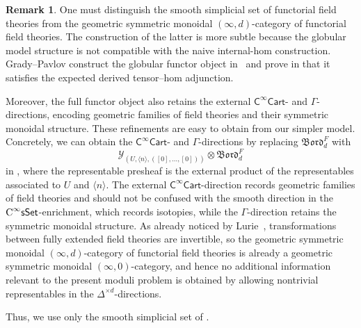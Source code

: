 \documentclass{amsart}
\newcommand{\cat}[1]{\mathsf{#1}}
\newcommand{\sset}{\cat{sSet}}
\newcommand{\CsSet}{\textnormal{C}^{\infty}\sset}
\newcommand{\Cart}{\cat{C}^{\infty}\cat{Cart}}
\newcommand{\Bord}{\mathfrak{Bord}}
\newcommand{\Yo}{\mathscr{Y}}
\theoremstyle{definition}
\newtheorem{remark}[equation]{Remark}
\numberwithin{equation}{subsection}
\numberwithin{subsubsection}{subsection}
\begin{document}
\begin{remark}
  One must distinguish the smooth simplicial set of
  functorial field theories from the geometric symmetric monoidal
  \((\infty,d)\)-category of functorial field theories. The construction of the
  latter is
  more subtle because the globular model structure is not compatible with
  the naive internal-hom construction. Grady--Pavlov construct the
  globular functor object in~\cite[Definition~3.2.9]{GP26} and prove in
  \cite[Proposition~3.2.10]{GP26} that it satisfies the expected derived
  tensor--hom adjunction.

  Moreover, the full functor object also retains the external \(\Cart\)- and
  \(\Gamma\)-directions, encoding geometric families of field theories and
  their symmetric monoidal structure. These refinements are easy to obtain from
  our simpler model. Concretely, we can obtain the \(\Cart\)- and
  \(\Gamma\)-directions by replacing
  \(\Bord_d^F\) with
  \begin{equation}\label{eq:more.general.target.for.moduli.space}
    \Yo_{(U,\langle n\rangle,([0],\ldots,[0]))}
    \otimes\Bord_d^F
  \end{equation}
  in , where the representable presheaf is the external
  product of
  the representables associated to \(U\) and \(\langle n\rangle\). The
  external \(\Cart\)-direction records geometric families of field theories
  and should not be confused with the smooth direction in the
  \(\CsSet\)-enrichment, which records isotopies, while the
  \(\Gamma\)-direction retains the symmetric monoidal structure. As already
  noticed by Lurie~\cite[Remark~2.4.7(a)]{Lur09}, transformations between fully
  extended field theories are invertible, so the geometric symmetric monoidal
  \((\infty,d)\)-category of functorial field theories is already a geometric
  symmetric monoidal \((\infty, 0)\)-category, and hence no additional
  information relevant to the present moduli problem is obtained by allowing
  nontrivial representables in the \(\Delta^{\times d}\)-directions.

  Thus, we use only the smooth simplicial set of
  .
\end{remark}
\end{document}
